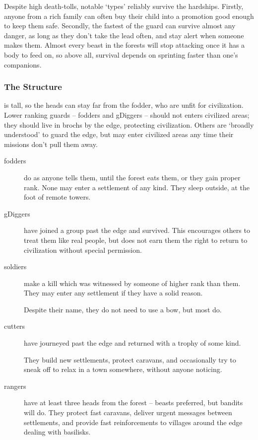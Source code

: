 \begin{multicols}{2}
Despite high death-tolls, notable `types' reliably survive the hardships.
Firstly, anyone from a rich family can often buy their child into a promotion good enough to keep them safe.
Secondly, the fastest of the \gls{guard} can survive almost any danger, as long as they don't take the lead often, and stay alert when someone makes them.
Almost every beast in the forests will stop attacking once it has a body to feed on, so above all, survival depends on sprinting faster than one's companions.

\subsubsection{The Structure}
is tall, so the heads can stay far from the fodder, who are unfit for civilization.
Lower ranking \glspl{guard} -- \glspl{fodder} and \glspl{gDigger} -- should not enters civilized areas; they should live in \glspl{broch} by the \gls{edge}, protecting civilization.
Others are `broadly understood' to guard the \gls{edge}, but may enter civilized areas any time their missions don't pull them away.

\begin{description}
  \item[\Glspl{fodder}]
  \label{fodder}%
  do as anyone tells them, until the forest eats them, or they gain proper rank.
  None may enter a settlement of any kind.
  They sleep outside, at the foot of remote towers.

  \item[\Glspl{gDigger}]
  have joined a group past the \gls{edge} and survived.
  This encourages others to treat them like real people, but does not earn them the right to return to civilization without special permission.

  \item[\Glspl{soldier}]
  make a kill which was witnessed by someone of higher rank than them.
  They may enter any settlement if they have a solid reason.

  Despite their name, they do not need to use a bow, but most do.

  \item[\Glspl{cutter}]
  have journeyed past the \gls{edge} and returned with a trophy of some kind.

  They build new settlements, protect caravans, and occasionally try to sneak off to relax in a town somewhere, without anyone noticing.

  \item[\Glspl{ranger}]
  \label{ranger}
  have at least three heads from the forest -- beasts preferred, but bandits will do.
  They protect fast caravans, deliver urgent messages between settlements, and provide fast reinforcements to \glspl{village} around the \gls{edge} dealing with \glspl{basilisk}.


\end{description}
\end{multicols}
